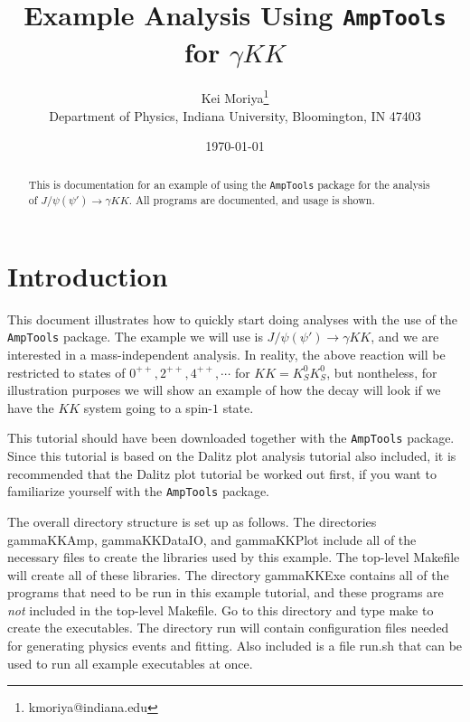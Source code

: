\documentclass[11pt]{article}
\newcommand{\AmpTools}{{\tt{AmpTools}}}
\begin{document}

\title{Example Analysis Using \AmpTools{} for $\gamma KK$}
\author{Kei Moriya\footnote{kmoriya@indiana.edu} \\
  Department of Physics, Indiana University, Bloomington, IN 47403}
\date{\today}

\maketitle

\begin{abstract}
This is documentation for an example of using the \AmpTools{} package
for the analysis of $J/\psi (\psi') \to \gamma KK$. All programs are
documented, and usage is shown.
\end{abstract}

\section{Introduction}

This document illustrates how to quickly start doing analyses with the
use of the \AmpTools{} package. The example we will use is $J/\psi
(\psi') \to \gamma K K$, and we are interested in a mass-independent
analysis. In reality, the above reaction will be restricted to states
of $0^{++}, 2^{++}, 4^{++}, \cdots$ for $KK = K_{S}^{0} K_{S}^{0}$,
but nontheless, for illustration purposes we will show an example of
how the decay will look if we have the $KK$ system going to a spin-$1$
state.

This tutorial should have been downloaded together with the
\AmpTools{} package. Since this tutorial is based on the Dalitz plot
analysis tutorial also included, it is recommended that the Dalitz
plot tutorial be worked out first, if you want to familiarize yourself
with the \AmpTools{} package.

The overall directory structure is set up as follows. The directories
gammaKKAmp, gammaKKDataIO, and gammaKKPlot include all of the
necessary files to create the libraries used by this example. The
top-level Makefile will create all of these libraries. The directory
gammaKKExe contains all of the programs that need to be run in this
example tutorial, and these programs are \textit{not} included in the
top-level Makefile. Go to this directory and type make to create the
executables. The directory run will contain configuration files needed
for generating physics events and fitting. Also included is a file
run.sh that can be used to run all example executables at once.
\end{document}

